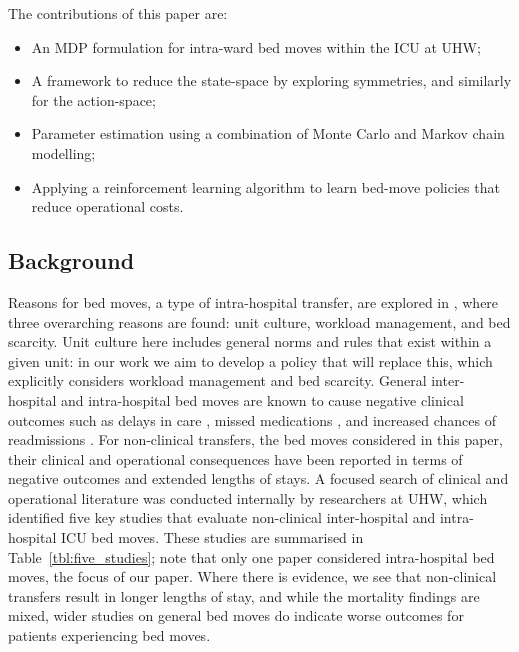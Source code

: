 \documentclass{article}
\begin{document}
The contributions of this paper are:

\begin{itemize}
  \item An MDP formulation for intra-ward bed moves within the ICU at UHW;
  \item A framework to reduce the state-space by exploring symmetries, and
  similarly for the action-space;
  \item Parameter estimation using a combination of Monte Carlo and Markov chain
  modelling;
  \item Applying a reinforcement learning algorithm to learn bed-move policies
  that reduce operational costs.
\end{itemize}

\subsection{Background}
Reasons for bed moves, a type of intra-hospital transfer, are explored in
\cite{rosenberg18}, where three overarching reasons are found: unit culture,
workload management, and bed scarcity.
Unit culture here includes general norms and rules that exist within a given
unit: in our work we aim to develop a policy that will replace this, which
explicitly considers workload management and bed scarcity.
General inter-hospital and intra-hospital bed moves are known to cause negative
clinical outcomes such as delays in care \cite{horwitz08}, missed medications
\cite{lee10}, and increased chances of readmissions \cite{araujo13}.
For non-clinical transfers, the bed moves considered in this paper, their
clinical and operational consequences have been reported in terms of negative
outcomes and extended lengths of stays.
A focused search of clinical and operational literature was conducted internally
by researchers at UHW, which identified five key studies that evaluate
non-clinical inter-hospital and intra-hospital ICU bed moves.
These studies are summarised in Table~\ref{tbl:five_studies}; note that only one
paper considered intra-hospital bed moves, the focus of our paper.
Where there is evidence, we see that non-clinical transfers result in longer
lengths of stay, and while the mortality findings are mixed, wider studies on
general bed moves do indicate worse outcomes for patients experiencing bed
moves.
\end{document}

